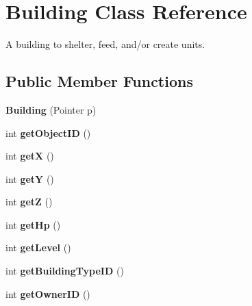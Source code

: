 \hypertarget{classBuilding}{
\section{Building Class Reference}
\label{classBuilding}
}
A building to shelter, feed, and/or create units.  


\subsection*{Public Member Functions}
\begin{CompactItemize}
\item 
\hypertarget{classBuilding_5bb038e1c890d73c2161ff08ea6086a0}{
\textbf{Building} (Pointer p)}
\label{classBuilding_5bb038e1c890d73c2161ff08ea6086a0}

\item 
\hypertarget{classBuilding_f7bea63fbc209c3a348720eabda2625d}{
int \textbf{getObjectID} ()}
\label{classBuilding_f7bea63fbc209c3a348720eabda2625d}

\item 
\hypertarget{classBuilding_028fed33d87eb61bbfe964937e887349}{
int \textbf{getX} ()}
\label{classBuilding_028fed33d87eb61bbfe964937e887349}

\item 
\hypertarget{classBuilding_675148df2cf1596be3c60b9935751847}{
int \textbf{getY} ()}
\label{classBuilding_675148df2cf1596be3c60b9935751847}

\item 
\hypertarget{classBuilding_df2b7cb86eba3958df598c112a71b824}{
int \textbf{getZ} ()}
\label{classBuilding_df2b7cb86eba3958df598c112a71b824}

\item 
\hypertarget{classBuilding_941600423b8f67aeb5b5fb7eae40c259}{
int \textbf{getHp} ()}
\label{classBuilding_941600423b8f67aeb5b5fb7eae40c259}

\item 
\hypertarget{classBuilding_caaed1f1d99a7cc94c8466c68851f6a7}{
int \textbf{getLevel} ()}
\label{classBuilding_caaed1f1d99a7cc94c8466c68851f6a7}

\item 
\hypertarget{classBuilding_d78120c8f3447bc9738d300e0d82468e}{
int \textbf{getBuildingTypeID} ()}
\label{classBuilding_d78120c8f3447bc9738d300e0d82468e}

\item 
\hypertarget{classBuilding_853c197c784ea28355d1801c60ea0ece}{
int \textbf{getOwnerID} ()}
\label{classBuilding_853c197c784ea28355d1801c60ea0ece}


\end{CompactItemize}
